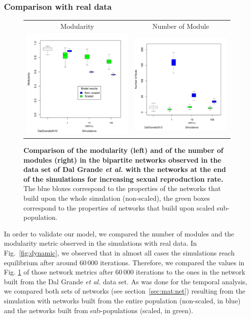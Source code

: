 \documentclass[fleqn,10pt]{wlscirep}
\begin{document}
\subsubsection{Comparison with real data}


\label{sec:res:sex:comp}
\begin{figure}[ht!]
\centering
\begin{tabular}{cc}
   Modularity & Number of Module \\
\includegraphics[width=.4\linewidth]{img/QbMetcompare.pdf} &
\includegraphics[width=.4\linewidth]{img/NestedNODFcompare.pdf}\\
\end{tabular}
\caption{\textbf{Comparison of the modularity (left) and of the number of modules (right) in the bipartite networks observed in the data set of Dal Grande \emph{et al.}\cite{dal2012vertical} with the networks at the end of the simulations for increasing sexual reproduction rate.} The blue bloxes correspond to the properties of the networks that build upon the whole simulation (non-scaled), the green boxes correspond to the properties of networks that build upon scaled sub-population.}
\label{fig:modules}
\end{figure}

In order to validate our model, we compared the number of modules and the modularity metric observed in the simulations with real data. In Fig.~\ref{fig:dynamic}, we observed that in almost all cases the simulations reach equilibrium after around $60\,000$ iterations. Therefore, we compared the values in Fig. \ref{fig:modules} of those network metrics after $60\,000$ iterations to the ones in the network built from the Dal Grande \emph{et al.} data set. As was done for the temporal analysis, we compared both sets of networks (see section~\ref{sec:mat:net}) resulting from the simulation with networks built from the entire population (non-scaled, in blue) and the networks built from sub-populations (scaled, in green).
\end{document}
